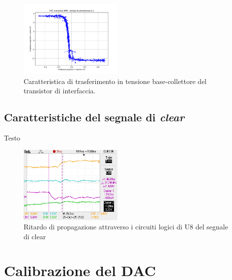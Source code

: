 \documentclass[journal]{IEEEtran}
\begin{document}
\begin{figure}[H]%
\begin{center}
\includegraphics[width=0.45\textwidth]{analysis/output/NPN-XY.pdf}
\caption{Caratteristica di trasferimento in tensione base-collettore del transistor di interfaccia.}
\label{fig:inverter_ring_xy}
\end{center}
\end{figure}


\subsection{Caratteristiche del segnale di \textit{clear}}
Testo

\begin{figure}[H]%
\begin{center}
\includegraphics[width=0.45\textwidth]{data-source/25-10-21/DeltaT-clear.JPG}
\caption{Ritardo di propagazione attraverso i circuiti logici di U8 del segnale di clear}
\label{fig:inverter_ring_xy}
\end{center}
\end{figure}


\section{Calibrazione del DAC}
\end{document}
